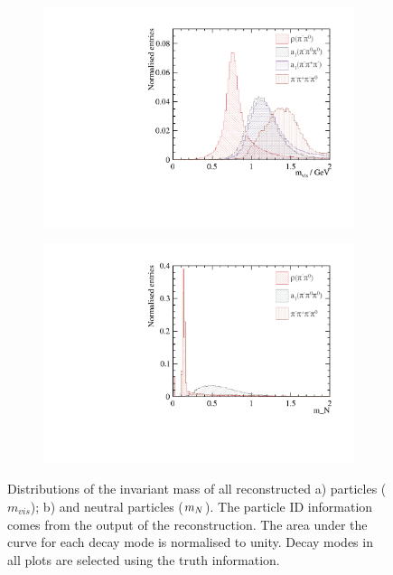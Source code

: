 \begin{figure}[htbp]
\centering
\begin{subfigure}[b]{0.45\textwidth}
 \includegraphics[width=\textwidth]{tau/var2/mVis_100GeV_improved_zoom.pdf}
  \caption{}
  \label{fig:tauVarMVis}
\end{subfigure}
\begin{subfigure}[b]{0.45\textwidth}
 \includegraphics[width=\textwidth]{tau/mNeutral_100GeV_improved_zoom.pdf}
  \caption{}
  \label{fig:tauVarMNeutral}
\end{subfigure}
\caption
{Distributions of  the invariant mass of all reconstructed a) particles (${m}_{vis}$); b) and neutral particles (${m}_{N}$). The particle ID information comes from the output of the \pandora reconstruction. The area under the curve for each decay mode is normalised to unity. Decay modes in all plots are selected using the truth information.}
\label{fig:tauVar}
\end{figure}

